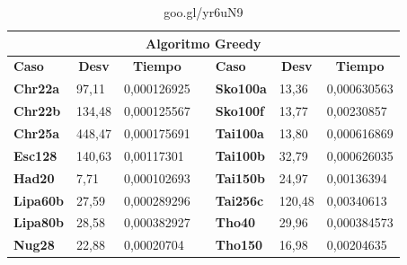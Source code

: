 \documentclass[a4paper, 12pt]{article}
\begin{document}
\begin{table}[H]
\centering
\caption{goo.gl/yr6uN9}
\label{my-label}
\begin{tabular}{|l|l|l|l|l|l|l|}
\hline
\multicolumn{7}{|c|}{\textbf{Algoritmo Greedy}}                                                                                                                                                \\ \hline
\textbf{Caso}    & \multicolumn{1}{c|}{\textbf{Desv}} & \multicolumn{1}{c|}{\textbf{Tiempo}} &  & \textbf{Caso}    & \multicolumn{1}{c|}{\textbf{Desv}} & \multicolumn{1}{c|}{\textbf{Tiempo}} \\ \cline{1-3} \cline{5-7} 
\textbf{Chr22a}  & 97,11                              & 0,000126925                          &  & \textbf{Sko100a} & 13,36                              & 0,000630563                          \\ \cline{1-3} \cline{5-7} 
\textbf{Chr22b}  & 134,48                             & 0,000125567                          &  & \textbf{Sko100f} & 13,77                              & 0,00230857                           \\ \cline{1-3} \cline{5-7} 
\textbf{Chr25a}  & 448,47                             & 0,000175691                          &  & \textbf{Tai100a} & 13,80                              & 0,000616869                          \\ \cline{1-3} \cline{5-7} 
\textbf{Esc128}  & 140,63                             & 0,00117301                           &  & \textbf{Tai100b} & 32,79                              & 0,000626035                          \\ \cline{1-3} \cline{5-7} 
\textbf{Had20}   & 7,71                               & 0,000102693                          &  & \textbf{Tai150b} & 24,97                              & 0,00136394                           \\ \cline{1-3} \cline{5-7} 
\textbf{Lipa60b} & 27,59                              & 0,000289296                          &  & \textbf{Tai256c} & 120,48                             & 0,00340613                           \\ \cline{1-3} \cline{5-7} 
\textbf{Lipa80b} & 28,58                              & 0,000382927                          &  & \textbf{Tho40}   & 29,96                              & 0,000384573                          \\ \cline{1-3} \cline{5-7} 
\textbf{Nug28}   & 22,88                              & 0,00020704                           &  & \textbf{Tho150}  & 16,98                              & 0,00204635                           \\ \cline{1-3} \cline{5-7} 

\end{tabular}
\end{table}
\end{document}
